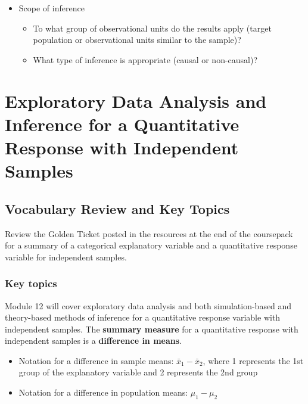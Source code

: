 \documentclass[
]{report}
\begin{document}
\newpage

\begin{itemize}
\item
  Scope of inference

  \begin{itemize}
  \item
    To what group of observational units do the results apply (target population or observational units similar to the sample)?
  \item
    What type of inference is appropriate (causal or non-causal)?
  \end{itemize}
\end{itemize}

\newpage

\chapter{Exploratory Data Analysis and Inference for a Quantitative Response with Independent Samples}\label{exploratory-data-analysis-and-inference-for-a-quantitative-response-with-independent-samples}

\section{Vocabulary Review and Key Topics}\label{vocabulary-review-and-key-topics-9}

Review the Golden Ticket posted in the resources at the end of the coursepack for a summary of a categorical explanatory variable and a quantitative response variable for independent samples.

\subsection{Key topics}\label{key-topics-11}

Module 12 will cover exploratory data analysis and both simulation-based and theory-based methods of inference for a quantitative response variable with independent samples. The \textbf{summary measure} for a quantitative response with independent samples is a \textbf{difference in means}.

\begin{itemize}
\item
  Notation for a difference in sample means: \(\bar{x}_1 - \bar{x}_2\), where 1 represents the 1st group of the explanatory variable and 2 represents the 2nd group
\item
  Notation for a difference in population means: \(\mu_1 - \mu_2\)
\end{itemize}
\end{document}
